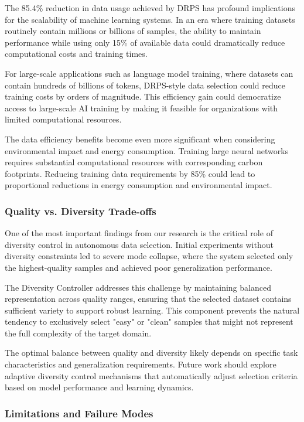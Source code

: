 \documentclass[12pt]{article}
\begin{document}
The 85.4\% reduction in data usage achieved by DRPS has profound implications for the scalability of machine learning systems. In an era where training datasets routinely contain millions or billions of samples, the ability to maintain performance while using only 15\% of available data could dramatically reduce computational costs and training times.

For large-scale applications such as language model training, where datasets can contain hundreds of billions of tokens, DRPS-style data selection could reduce training costs by orders of magnitude. This efficiency gain could democratize access to large-scale AI training by making it feasible for organizations with limited computational resources.

The data efficiency benefits become even more significant when considering environmental impact and energy consumption. Training large neural networks requires substantial computational resources with corresponding carbon footprints. Reducing training data requirements by 85\% could lead to proportional reductions in energy consumption and environmental impact.

\subsubsection{Quality vs. Diversity Trade-offs}\label{quality-diversity}

One of the most important findings from our research is the critical role of diversity control in autonomous data selection. Initial experiments without diversity constraints led to severe mode collapse, where the system selected only the highest-quality samples and achieved poor generalization performance.

The Diversity Controller addresses this challenge by maintaining balanced representation across quality ranges, ensuring that the selected dataset contains sufficient variety to support robust learning. This component prevents the natural tendency to exclusively select "easy" or "clean" samples that might not represent the full complexity of the target domain.

The optimal balance between quality and diversity likely depends on specific task characteristics and generalization requirements. Future work should explore adaptive diversity control mechanisms that automatically adjust selection criteria based on model performance and learning dynamics.

\subsubsection{Limitations and Failure Modes}\label{limitations}
\end{document}
